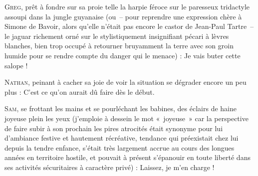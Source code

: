 \begin{dialogue}
\textsc{Greg}, prêt à fondre sur sa proie telle la harpie féroce sur le paresseux tridactyle assoupi dans la jungle guyanaise (ou~-- pour reprendre une expression chère à Simone de Bavoir, alors qu’elle n’était pas encore le castor de Jean-Paul Tartre~-- le jaguar richement orné sur le stylistiquement insignifiant pécari à lèvres blanches, bien trop occupé à retourner bruyamment la terre avec son groin humide pour se rendre compte du danger qui le menace) : Je vais buter cette salope !

\textsc{Nathan}, peinant à cacher sa joie de voir la situation se dégrader encore un peu plus : C’est ce qu’on aurait dû faire dès le début.

\textsc{Sam}, se frottant les mains et se pourléchant les babines, des éclairs de haine joyeuse plein les yeux (j’emploie à dessein le mot «~joyeuse~» car la perspective de faire subir à son prochain les pires atrocités était synonyme pour lui d’ambiance festive et hautement récréative, tendance qui préexistait chez lui depuis la tendre enfance, s’était très largement accrue au cours des longues années en territoire hostile, et pouvait à présent s’épanouir en toute liberté dans ses activités sécuritaires à caractère privé) : Laissez, je m’en charge !


\end{dialogue}
